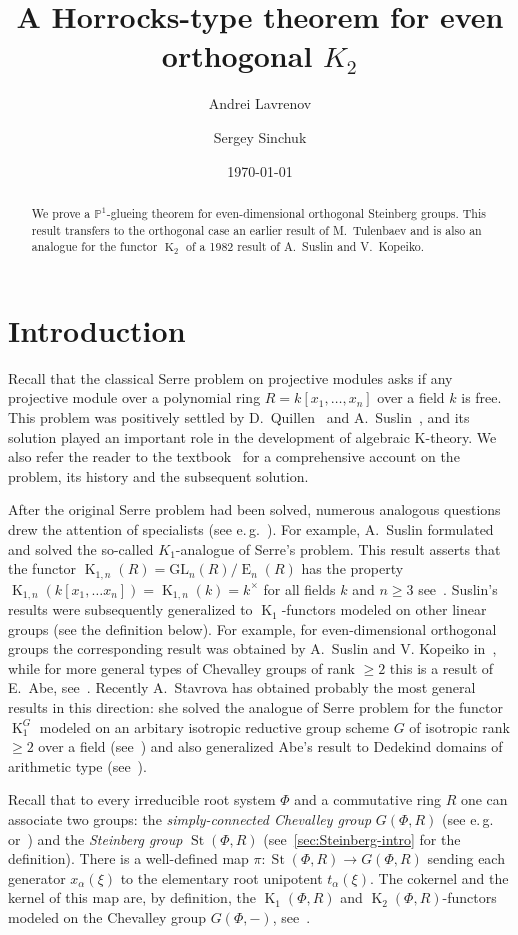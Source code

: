 \documentclass[oneside, 8pt]{amsart}
\title{A Horrocks-type theorem for even orthogonal $K_2$}
\author{Andrei Lavrenov}
\author {Sergey Sinchuk}
\date {\today}
\theoremstyle{remark}
\theoremstyle{definition}
\numberwithin{lemma}{section}
\numberwithin{prop}{section}
\numberwithin{corollary}{section}
\numberwithin{externaltheorem}{section}
\DeclareMathOperator{\St}{St}
\DeclareMathOperator{\E}{E}
\DeclareMathOperator{\K}{K}
\numberwithin{equation}{section}
\begin{document}
\begin{abstract} We prove a $\mathbb{P}^1$-glueing theorem for even-dimensional orthogonal Steinberg groups. This result transfers to the orthogonal case an earlier result of M.~Tulenbaev and is also an analogue for the functor $\K_2$ of a 1982 result of A.~Suslin and V.~Kopeiko. \end{abstract}
\maketitle
\section{Introduction}
Recall that the classical Serre problem on projective modules asks if any projective module over a polynomial ring $R = k[x_1,\ldots, x_n]$ over a field $k$ is free. This problem was positively settled by D.~Quillen~\cite{Qu76} and A.~Suslin~\cite{Su76}, and its solution played an important role in the development of algebraic K-theory. We also refer the reader to the textbook~\cite{Lam10} for a comprehensive account on the problem, its history and the subsequent solution.

After the original Serre problem had been solved, numerous analogous questions drew the attention of specialists (see e.\,g.~\cite{Su77, Su82, Abe83, Tu83, Lam10, St-poly, St-Ded}). For example, A.~Suslin formulated and solved the so-called $K_1$-analogue of Serre's problem. This result asserts that the functor $\K_{1,n}(R) = \mathrm{GL}_{n}(R)/\E_n(R)$ has the property $\K_{1,n}(k[x_1, \ldots x_n]) = \K_{1,n}(k) = k^\times$ for all fields $k$ and $n \geq 3$ see~\cite[Corollary~7.11]{Su77}. Suslin's results were subsequently generalized to $\K_1$-functors modeled on other linear groups (see the definition below). For example, for even-dimensional orthogonal groups the corresponding result was obtained by A.~Suslin and V. Kopeiko in~\cite{Su82}, while for more general types of Chevalley groups of rank $\geq 2$ this is a result of E.~Abe, see~\cite{Abe83}. Recently A.~Stavrova has obtained probably the most general results in this direction: she solved the analogue of Serre problem for the functor $\K_1^G$ modeled on an arbitary isotropic reductive group scheme $G$ of isotropic rank $\geq 2$ over a field (see~\cite[Theorem~1.2]{St-poly}) and also generalized Abe's result to Dedekind domains of arithmetic type (see~\cite[Corollary~1.2]{St-Ded}).

Recall that to every irreducible root system $\Phi$ and a commutative ring $R$ one can associate two groups: the {\it simply-connected Chevalley group} $G(\Phi, R)$ (see e.\,g.~\cite[\S~3]{St71} or~\cite{VP}) and the {\it Steinberg group} $\St(\Phi, R)$ (see~\cref{sec:Steinberg-intro} for the definition). There is a well-defined map $\pi \colon \St(\Phi, R) \to G(\Phi, R)$ sending each generator $x_\alpha(\xi)$ to the elementary root unipotent $t_\alpha(\xi)$. The cokernel and the kernel of this map are, by definition, the $\K_1(\Phi, R)$ and $\K_2(\Phi, R)$-functors modeled on the Chevalley group $G(\Phi, -)$, see~\cite{St78}.
\end{document}
